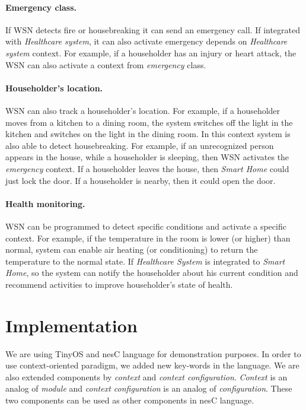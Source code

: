 \documentclass{ubicomp-ext}
\begin{document}
\paragraph{Emergency class.} If WSN detects fire or housebreaking it can send an emergency call. If integrated with \textit{Healthcare system}, it can also activate emergency depends on \textit{Healthcare system} context. For example, if a householder has an injury or heart attack, the WSN can also activate a context from \textit{emergency} class.

\paragraph{Householder's location.} WSN can also track a householder's location. For example, if a householder moves from a kitchen to a dining room, the system switches off the light in the kitchen and switches on the light in the dining room. In this context system is also able to detect housebreaking. For example, if an unrecognized person appears in the house, while a householder is sleeping, then WSN activates the \textit{emergency} context. If a householder leaves the house, then \textit{Smart Home} could just lock the door. If a householder is nearby, then it could open the door.

\paragraph{Health monitoring.} WSN can be programmed to detect specific conditions and activate a specific context. For example, if the temperature in the room is lower (or higher) than normal, system can enable air heating (or conditioning) to return the temperature to the normal state. If \textit{Healthcare System} is integrated to \textit{Smart Home}, so the system can notify the householder about his current condition and recommend activities to improve householder's state of health.

\section{Implementation}
We are using TinyOS and nesC language for demonstration purposes. In order to use context-oriented paradigm, we added new key-words in the language. We are also extended components by \textit{context} and \textit{context configuration}. \textit{Context} is an analog of \textit{module} and \textit{context configuration} is an analog of \textit{configuration}. These two components can be used as other components in nesC language.
\end{document}
